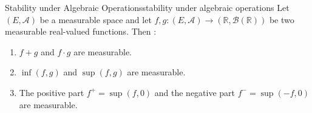 
\begin{corollary}{Stability under Algebraic Operations}{stability under algebraic operations}
Let $(E, \mathcal{A})$ be a measurable space and let $f, g : (E, \mathcal{A}) \to (\mathbb{R}, \mathcal{B}(\mathbb{R}))$ be two measurable real-valued functions. Then :
\begin{enumerate}
    \item $f + g$ and $f \cdot g$ are measurable.
    \item $\inf(f, g)$ and $\sup(f, g)$ are measurable.
    \item The positive part $f^+ = \sup(f, 0)$ and the negative part $f^- = \sup(-f, 0)$ are measurable.
\end{enumerate}
\end{corollary}

